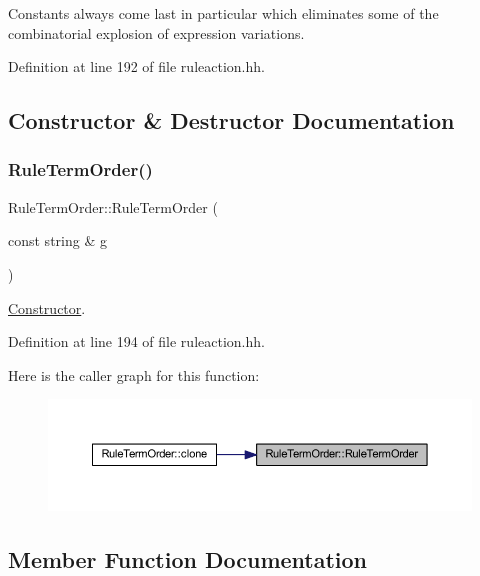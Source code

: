 Constants always come last in particular which eliminates some of the combinatorial explosion of expression variations. 

Definition at line 192 of file ruleaction.\+hh.



\subsection{Constructor \& Destructor Documentation}
\mbox{\label{class_rule_term_order_a2df369bf247f644ca3e52903e7696d1d}} 
\subsubsection{\texorpdfstring{RuleTermOrder()}{RuleTermOrder()}}
{\footnotesize\ttfamily Rule\+Term\+Order\+::\+Rule\+Term\+Order (\begin{DoxyParamCaption}\item[{const string \&}]{g }\end{DoxyParamCaption})\hspace{0.3cm}{\ttfamily [inline]}}



\mbox{\hyperlink{class_constructor}{Constructor}}. 



Definition at line 194 of file ruleaction.\+hh.

Here is the caller graph for this function\+:
\nopagebreak
\begin{figure}[H]
\begin{center}
\leavevmode
\includegraphics[width=350pt]{class_rule_term_order_a2df369bf247f644ca3e52903e7696d1d_icgraph}
\end{center}
\end{figure}


\subsection{Member Function Documentation}
\mbox{\label{class_rule_term_order_a3f3c26d28f966bd5cbc24c056f0c324b}} 
